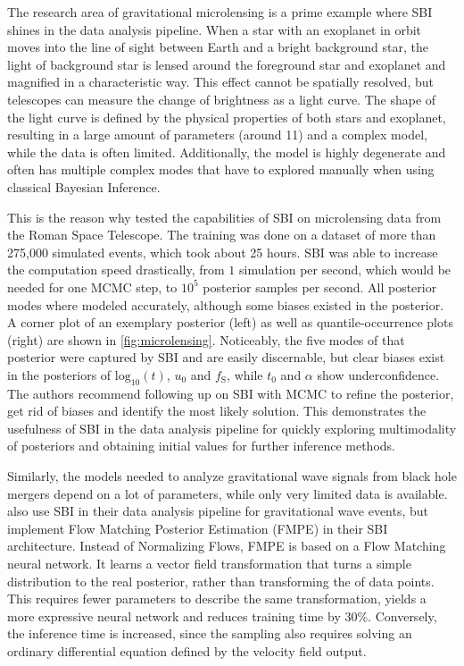 The research area of gravitational microlensing is a prime example where SBI shines in the data analysis pipeline.
When a star with an exoplanet in orbit moves into the line of sight between Earth and a bright background star, the light of background star is lensed around the foreground star and exoplanet and magnified in a characteristic way.
This effect cannot be spatially resolved, but telescopes can measure the change of brightness as a light curve.
The shape of the light curve is defined by the physical properties of both stars and exoplanet, resulting in a large amount of parameters (around 11) and a complex model, while the data is often limited.
Additionally, the model is highly degenerate and often has multiple complex modes that have to explored manually when using classical Bayesian Inference.

This is the reason why \cite{microlensing-sbi} tested the capabilities of SBI on microlensing data from the Roman Space Telescope.
The training was done on a dataset of more than 275,000 simulated events, which took about 25 hours.
SBI was able to increase the computation speed drastically, from $1$ simulation per second, which would be needed for one MCMC step, to $10^5$ posterior samples per second.
All posterior modes where modeled accurately, although some biases existed in the posterior.
A corner plot of an exemplary posterior (left) as well as quantile-occurrence plots (right) are shown in \cref{fig:microlensing}.
Noticeably, the five modes of that posterior were captured by SBI and are easily discernable, but clear biases exist in the posteriors of $\text{log}_{10}(t)$, $u_0$ and $f_\text{S}$, while $t_0$ and $\alpha$ show underconfidence.
The authors recommend following up on SBI with MCMC to refine the posterior, get rid of biases and identify the most likely solution.
This demonstrates the usefulness of SBI in the data analysis pipeline for quickly exploring multimodality of posteriors and obtaining initial values for further inference methods.

Similarly, the models needed to analyze gravitational wave signals from black hole mergers depend on a lot of parameters, while only very limited data is available.
\cite{flow-matching-sbi} also use SBI in their data analysis pipeline for gravitational wave events, but implement Flow Matching Posterior Estimation (FMPE) in their SBI architecture.
Instead of Normalizing Flows, FMPE is based on a Flow Matching neural network. 
It learns a vector field transformation that turns a simple distribution to the real posterior, rather than transforming the of data points.
This requires fewer parameters to describe the same transformation, yields a more expressive neural network and reduces training time by 30\%.
Conversely, the inference time is increased, since the sampling also requires solving an ordinary differential equation defined by the velocity field output.

